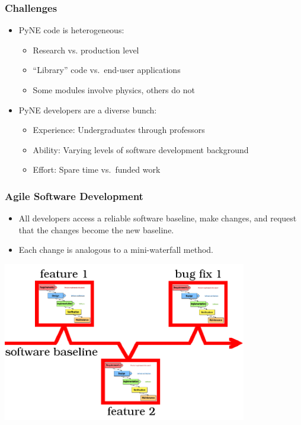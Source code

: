 \documentclass[12pt]{beamer}
\begin{document}
\begin{frame}[fragile]
\frametitle{Challenges}

\begin{itemize}
\item{PyNE code is heterogeneous:}
    \begin{itemize}
    \item{Research vs. production level}
    \item{``Library'' code vs.\ end-user applications}
    \item{Some modules involve physics, others do not}
    \end{itemize}
\item{PyNE developers are a diverse bunch}:
   \begin{itemize}
   \item{Experience: Undergraduates through professors}
   \item{Ability: Varying levels of software development background}
   \item{Effort: Spare time vs.\ funded work}
   \end{itemize}
\end{itemize}

\end{frame}
\begin{frame}
\frametitle{Agile Software Development\cite{larman2004agile}}

\begin{itemize}
\item{All developers access a reliable software baseline, make changes, and request that the changes become the new baseline.}
\item{Each change is analogous to a mini-waterfall method.}
\end{itemize}

\centerline{\includegraphics[width=0.8\textwidth]{figures/agile.png}}

\end{frame}
\end{document}
